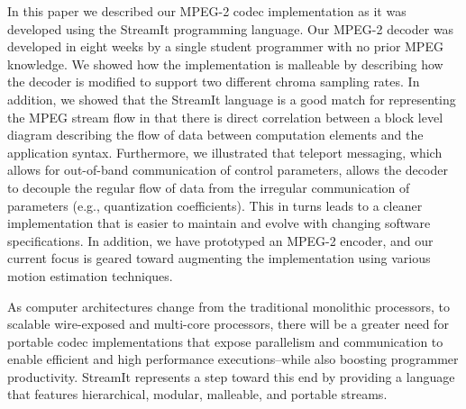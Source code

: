 
In this paper we described our MPEG-2 codec implementation as it was
developed using the StreamIt programming language. Our MPEG-2 decoder
was developed in eight weeks by a single student programmer with no
prior MPEG knowledge. We showed how the implementation is malleable by
describing how the decoder is modified to support two different chroma
sampling rates. In addition, we showed that the StreamIt language is a
good match for representing the MPEG stream flow in that there is
direct correlation between a block level diagram describing the flow of
data between computation elements and the application
syntax. Furthermore, we illustrated that teleport messaging, which
allows for out-of-band communication of control parameters, allows the
decoder to decouple the regular flow of data from the irregular
communication of parameters (e.g., quantization
coefficients). This in turns leads to a cleaner implementation that is
easier to maintain and evolve with changing software specifications.
In addition, we have prototyped an MPEG-2 encoder, and our current
focus is geared toward augmenting the implementation using various
motion estimation techniques.

As computer architectures change from the traditional monolithic
processors, to scalable wire-exposed and multi-core processors, there
will be a greater need for portable codec implementations that expose
parallelism and communication to enable efficient and high performance
executions--while also boosting programmer productivity.  StreamIt
represents a step toward this end by providing a language that
features hierarchical, modular, malleable, and portable streams.
